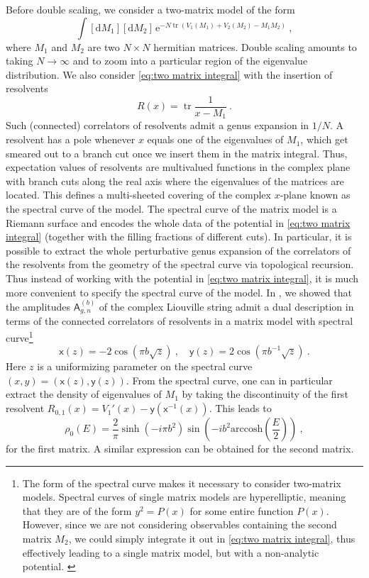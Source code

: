 \documentclass[12pt,a4paper]{article}
\DeclareMathOperator\tr{tr}
\renewcommand\d{\text{d}}
\newcommand{\xx}{\mathsf{x}}
\newcommand{\yy}{\mathsf{y}}
\begin{document}
Before double scaling, we consider a two-matrix model of the form
\begin{equation}
    \int [\d M_1][\d M_2]\, \mathrm{e}^{-N \tr(V_1(M_1) + V_2(M_2) - M_1 M_2)}~, \label{eq:two matrix integral}
\end{equation}
where $M_1$ and $M_2$ are two $N\times N$ hermitian matrices. Double scaling amounts to taking $N\rightarrow \infty$ and to zoom into a particular region of the eigenvalue distribution. We also consider \eqref{eq:two matrix integral} with the insertion of resolvents
\begin{equation}\label{eq: resolvent}
    R(x) = \tr \frac{1}{x- M_1}~.
\end{equation}
Such (connected) correlators of resolvents admit a genus expansion in $1/N$.
A resolvent has a pole whenever $x$ equals one of the eigenvalues of $M_1$, which get smeared out to a branch cut once we insert them in the matrix integral. Thus, expectation values of resolvents are multivalued functions in the complex plane with branch cuts along the real axis where the eigenvalues of the matrices are located. 
This defines a multi-sheeted covering of the complex $x$-plane known as the spectral curve of the model. The spectral curve of the matrix model is a Riemann surface and encodes the whole data of the potential in \eqref{eq:two matrix integral} (together with the filling fractions of different cuts). In particular, it is possible to extract the whole perturbative genus expansion of the correlators of the resolvents from the geometry of the spectral curve via topological recursion.
Thus instead of working with the potential in \eqref{eq:two matrix integral}, it is much more convenient to specify the spectral curve of the model.
In \cite{paper2}, we showed that the amplitudes $\mathsf{A}_{g,n}^{(b)}$ of the complex Liouville string admit a dual description in terms of the connected correlators of resolvents in a matrix model with spectral curve\footnote{The form of the spectral curve makes it necessary to consider two-matrix models. Spectral curves of single matrix models are hyperelliptic, meaning that they are of the form $y^2=P(x)$ for some entire function $P(x)$. However, since we are not considering observables containing the second matrix $M_2$, we could simply integrate it out in \eqref{eq:two matrix integral}, thus effectively leading to a single matrix model, but with a non-analytic potential. \label{footnote:two matrices}} 
\begin{equation}\label{eq: MM spectral curve}
    \xx(z) = -2 \cos(\pi b \sqrt{z})~,\quad \yy(z) = 2\cos(\pi b^{-1}\sqrt{z})~.
\end{equation}
Here $z$ is a uniformizing parameter on the spectral curve $(x,y)=(\xx(z),\yy(z))$.
From the spectral curve, one can in particular extract the density of eigenvalues of $M_1$ by taking the discontinuity of the first resolvent $R_{0,1}(x)=V_1'(x)-\yy(\xx^{-1}(x))$. This leads to
\begin{equation}\label{eq: eigenvalue distribution}
    \rho_0(E) = \frac{2}{\pi}\sinh(-i \pi b^2)\sin \left(- ib^2 \mathrm{arccosh}\left(\frac{E}{2}\right)\right)~,
\end{equation}
for the first matrix. A similar expression can be obtained for the second matrix.
\end{document}
